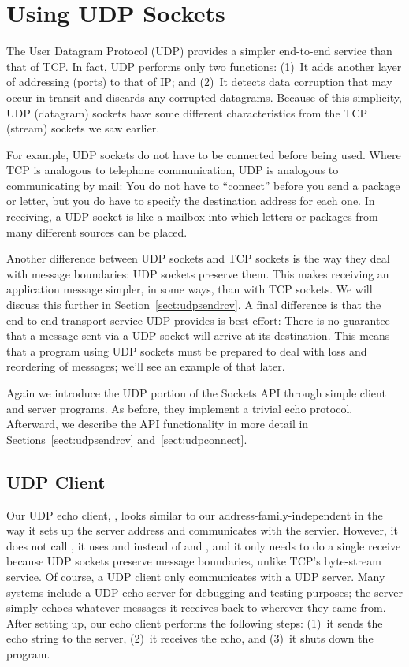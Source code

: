 \chapter{Using UDP Sockets}
\label{chap:udp}%

The User Datagram Protocol (UDP) provides a simpler end-to-end
service than that of TCP.  In fact, UDP performs only two functions:
(1)~It adds another
layer of addressing (ports) to that of IP; and (2)~It detects data
corruption that may occur in transit and discards any corrupted
datagrams.
Because of this simplicity, UDP (datagram) sockets have some different
characteristics from the TCP (stream) sockets we saw earlier.

For example, UDP sockets do not have to be connected before being
used.  Where TCP is analogous to telephone communication, UDP is
analogous to communicating by mail: You do not have to ``connect''
before you send a package or letter, but you do have to specify the
destination address for each one.  In receiving, a UDP
socket is like a mailbox into which letters or packages from many
different sources can be placed.

Another difference between UDP sockets and TCP sockets is the way
they deal with message boundaries: UDP sockets preserve them.  This
makes receiving an application message simpler, in some ways, than with
TCP sockets.  We will discuss this further in
Section~\ref{sect:udpsendrcv}.
A final difference is that the end-to-end transport service UDP
provides is best effort: There is no guarantee that a message sent
via a UDP socket will arrive at its destination.  This means that a
program using UDP sockets must be prepared to deal with loss and
reordering of messages; we'll see an example of that later.

Again we introduce the UDP portion of the Sockets API through simple
client and server programs.  As before, they implement a trivial
echo protocol.  Afterward, we describe the API functionality in more
detail in Sections~\ref{sect:udpsendrcv} and~\ref{sect:udpconnect}.

\section{UDP Client}

\noindent Our UDP echo client, , looks similar to
our address-family-independent
 in the way it sets up the server address
and communicates with the servier.  However,
it does not call , it uses 
and
 instead of  and
, and it only needs
to do a single receive because UDP sockets preserve message
boundaries, unlike TCP's byte-stream service.
%
Of course, a UDP client only communicates with a UDP server.  Many
systems include a UDP echo server for debugging and testing
purposes; the server simply echoes whatever messages it receives back to
wherever they came from.
After setting up, our echo client performs the following steps: (1)~it
sends the echo string to the server, (2)~it receives the echo, and
(3)~it shuts down the program.

